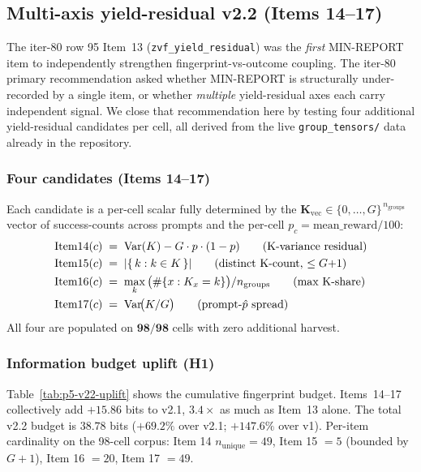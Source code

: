 \documentclass{article}  \usepackage[preprint,nonatbib]{neurips_2026} \usepackage[numbers]{natbib}
\begin{document}
 \subsection{Multi-axis yield-residual v2.2 (Items 14--17)}
\label{sec:p5-iter81-yield-axes}

The iter-80 row 95 Item~13 (\texttt{zvf\_yield\_residual}) was the \emph{first}
MIN-REPORT item to independently strengthen fingerprint-vs-outcome coupling.
The iter-80 primary recommendation asked whether MIN-REPORT is structurally
under-recorded by a single item, or whether \emph{multiple} yield-residual
axes each carry independent signal. We close that recommendation here by
testing four additional yield-residual candidates per cell, all derived
from the live \texttt{group\_tensors/} data already in the repository.

\subsubsection{Four candidates (Items 14--17)}
Each candidate is a per-cell scalar fully determined by the
$\mathbf{K}_{\mathrm{vec}} \in \{0,\dots,G\}^{\,n_{\mathrm{groups}}}$ vector of
success-counts across prompts and the per-cell $p_c = \mathrm{mean\_reward}/100$:
\begin{align}
  \mathrm{Item14}(c) &\;=\; \mathrm{Var}(K) - G \cdot p \cdot (1-p) \tag{K-variance residual}\\
  \mathrm{Item15}(c) &\;=\; |\{\,k : k \in K\,\}| \tag{distinct K-count, $\le G{+}1$}\\
  \mathrm{Item16}(c) &\;=\; \max_k\,\bigl(\#\{x : K_x = k\}\bigr) / n_{\mathrm{groups}} \tag{max K-share}\\
  \mathrm{Item17}(c) &\;=\; \mathrm{Var}\!\bigl(K/G\bigr) \tag{prompt-$\hat p$ spread}\\
  \label{eq:items14-17}
\end{align}
All four are populated on $\mathbf{98/98}$ cells with zero additional harvest.

\subsubsection{Information budget uplift (H1)}
Table~\ref{tab:p5-v22-uplift} shows the cumulative fingerprint budget.
Items~14--17 collectively add $+15.86$ bits to v2.1, $\mathbf{3.4\times}$
as much as Item~13 alone. The total v2.2 budget is $38.78$ bits
($+69.2\%$ over v2.1; $+147.6\%$ over v1). Per-item cardinality on the
98-cell corpus: Item 14 $n_{\mathrm{unique}} = 49$, Item 15 $= 5$ (bounded
by $G+1$), Item 16 $= 20$, Item 17 $= 49$.
\end{document}
